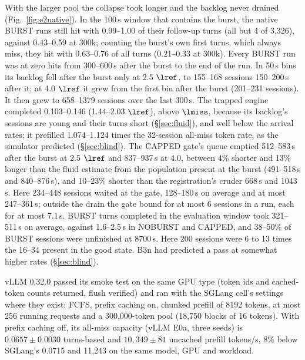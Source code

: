 With the larger pool the collapse took longer and the backlog never drained (Fig.~\ref{fig:e2native}). In the 100\,s window that contains the burst, the native BURST runs still hit with 0.99--1.00 of their follow-up turns (all but 4 of 3,326), against 0.43--0.59 at 300k; counting the burst's own first turns, which always miss, they hit with 0.63--0.76 of all turns (0.21--0.33 at 300k). Every BURST run was at zero hits from 300--600\,s after the burst to the end of the run. In 50\,s bins its backlog fell after the burst only at 2.5 $\lref$, to 155--168 sessions 150--200\,s after it; at 4.0 $\lref$ it grew from the first bin after the burst (201--231 sessions). It then grew to 658--1379 sessions over the last 300\,s. The trapped engine completed 0.103--0.146\sps{} (1.44--2.03 $\lref$), above $\lmiss$, because its backlog's sessions are young and their turns short (\S\ref{sec:fluid}), and well below the arrival rates; it prefilled 1.074--1.124 times the 32-session all-miss token rate, as the simulator predicted (\S\ref{sec:blind}). The CAPPED gate's queue emptied 512--583\,s after the burst at 2.5 $\lref$ and 837--937\,s at 4.0, between 4\% shorter and 13\% longer than the fluid estimate from the population present at the burst (491--518\,s and 840--876\,s), and 10--23\% shorter than the registration's cruder 668\,s and 1043\,s. Here 234--448 sessions waited at the gate, 128--180\,s on average and at most 247--361\,s; outside the drain the gate bound for at most 6 sessions in a run, each for at most 7.1\,s. BURST turns completed in the evaluation window took 321--511\,s on average, against 1.6--2.5\,s in NOBURST and CAPPED, and 38--50\% of BURST sessions were unfinished at 8700\,s. Here 200 sessions were 6 to 13 times the 16--34 present in the good state. B3n had predicted a pass at somewhat higher rates (\S\ref{sec:blind}).

vLLM 0.32.0 passed its smoke test on the same GPU type (token ids and cached-token counts returned, flush verified) and ran with the SGLang cell's settings where they exist: FCFS, prefix caching on, chunked prefill of 8192 tokens, at most 256 running requests and a 300,000-token pool (18,750 blocks of 16 tokens). With prefix caching off, its all-miss capacity (vLLM E0a, three seeds) is $0.0657\pm0.0030$\sps{} turns-based and $10{,}349\pm81$ uncached prefill tokens/s, 8\% below SGLang's 0.0715 and 11,243 on the same model, GPU and workload.

